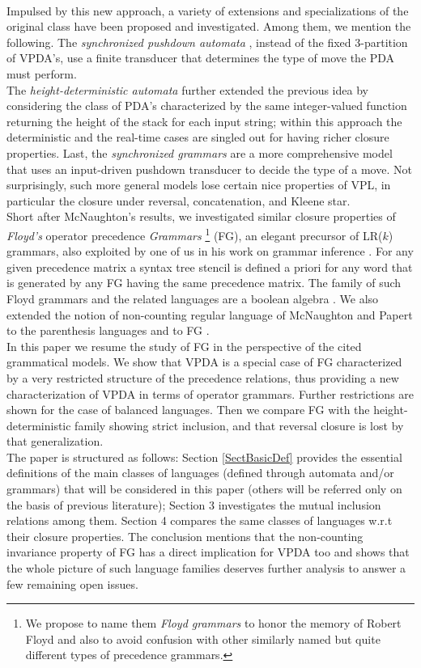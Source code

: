 \documentclass[3p,11pt]{elsarticle}
\begin{document}
\\
Impulsed by this new approach, a variety of extensions and specializations of the original class have been proposed and investigated. Among them, we mention the following.
 The \emph{synchronized pushdown automata} \cite{conf/dlt/Caucal06}, instead of the fixed 3-partition of VPDA's, use
 a finite transducer that determines the type of move the PDA must perform.
\\
 The \emph{height-deterministic automata} \cite{conf/mfcs/NowotkaS07} further extended the previous idea by considering the class of PDA's characterized by the same integer-valued function returning the height of the stack for each input string; within this approach the deterministic and the real-time cases are singled out for having richer closure properties.
 Last, the \emph{synchronized grammars} \cite{caucal:DSP:2008:1743} are a more comprehensive model
 that uses an input-driven pushdown transducer to decide the type of a move. Not surprisingly, such more general models lose certain nice properties of VPL, in particular the closure under reversal, concatenation, and Kleene star.
\\
Short after McNaughton's results, we investigated similar closure properties of \emph{Floyd's} operator precedence \emph{Grammars} \cite{Floyd1963} \footnote{We propose to name them \emph{Floyd grammars} to honor the memory of Robert Floyd and also to avoid confusion with other similarly named but quite different types of precedence grammars.} (FG), an elegant precursor of LR($k$) grammars, also exploited by one of us in his work on grammar inference \cite{crespi-72}. For any given precedence matrix a syntax tree stencil is defined a priori for any word that is generated by any FG having the same precedence matrix. The family of such Floyd grammars and the related languages are a boolean algebra \cite{Crespi-ReghizziMM1978}. We also extended the notion of non-counting regular language of McNaughton and Papert \cite{McNaughtPap71} to the parenthesis languages \cite{CreGuiMan78} and to FG \cite{CreGuiMan81}.
\\
In this paper we resume the study of FG in the perspective of the cited grammatical models. We show that VPDA is a special case of FG characterized by a very restricted structure of the precedence relations, thus providing a new characterization of VPDA in terms of operator grammars. Further restrictions are shown for the case of balanced languages. Then we compare FG with the height-deterministic family showing strict inclusion, and that reversal closure is lost by that generalization.
\\
The paper is structured as follows: Section \ref{SectBasicDef} provides the essential definitions of the main classes of languages (defined through automata and/or grammars) that will be considered in this paper (others will be referred only on the basis of previous literature); Section 3 investigates the mutual inclusion relations among them. Section 4 compares the same classes of languages w.r.t their closure properties. The conclusion mentions that the non-counting invariance property of FG has a direct implication for VPDA too and shows that the whole picture of such language families deserves further analysis to answer a few remaining open issues.
\end{document}
